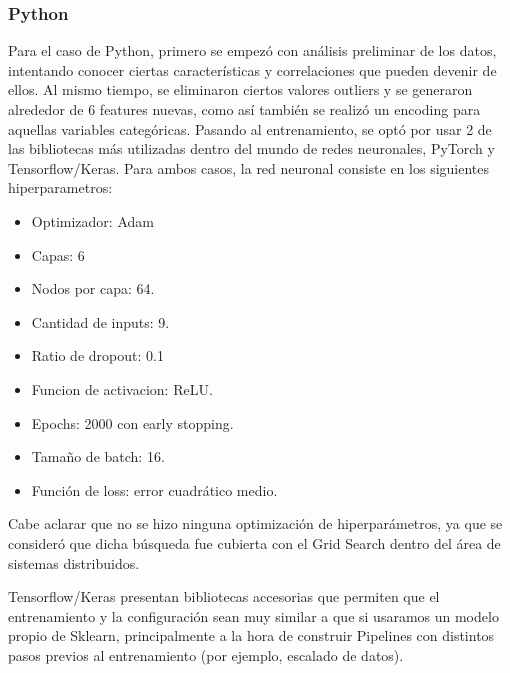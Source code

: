 \documentclass[11pt]{article}
\let\Oldsubsubsection\subsubsection
\renewcommand{\subsubsection}{\FloatBarrier\Oldsubsubsection}
\begin{document}
\subsubsection{Python}

Para el caso de Python, primero se empezó con análisis preliminar de los datos, intentando conocer ciertas características y correlaciones que pueden devenir de ellos. Al mismo tiempo, se eliminaron ciertos valores outliers y se generaron alrededor de 6 features nuevas, como así también se realizó un encoding para aquellas variables categóricas.
Pasando al entrenamiento, se optó por usar 2 de las bibliotecas más utilizadas dentro del mundo de redes neuronales, PyTorch y Tensorflow/Keras. Para ambos casos, la red neuronal consiste en los siguientes hiperparametros:

\begin{itemize}
    \item Optimizador: Adam
    \item Capas: 6
    \item Nodos por capa: 64.
    \item Cantidad de inputs: 9.
    \item Ratio de dropout: 0.1
    \item Funcion de activacion: ReLU.
    \item Epochs: 2000 con early stopping.
    \item Tamaño de batch: 16.
    \item Función de loss: error cuadrático medio.
\end{itemize}

Cabe aclarar que no se hizo ninguna optimización de hiperparámetros, ya que se consideró que dicha búsqueda fue cubierta con el Grid Search dentro del área de sistemas distribuidos.

Tensorflow/Keras presentan bibliotecas accesorias que permiten que el entrenamiento y la configuración sean muy similar a que si usaramos un modelo propio de Sklearn, principalmente a la hora de construir Pipelines con distintos pasos previos al entrenamiento (por ejemplo, escalado de datos).
\end{document}
